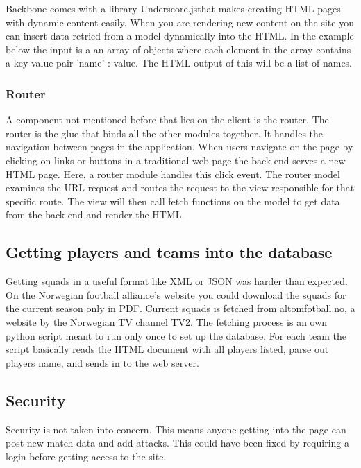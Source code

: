 Backbone comes with a library Underscore.js\footnotemark that makes creating HTML pages with dynamic content easily. When you are rendering new content on the site you can insert data retried from a model dynamically into the HTML. In the example below the input is a an array of objects where each element in the array contains a key value pair 'name' : value. The HTML output of this will be a list of names.




\subsubsection{Router}

A component not mentioned before that lies on the client is the router. The router is the glue that binds all the other modules together. It handles the navigation between pages in the application. When users navigate on the page by clicking on links or buttons in a traditional web page the back-end serves a new HTML page. Here, a router module handles this click event. The router model examines the URL request and routes the request to the view responsible for that specific route. The view will then call fetch functions on the model to get data from the back-end and render the HTML.

\subsection{Getting players and teams into the database}

Getting squads in a useful format like XML or JSON was harder than expected. On the Norwegian football alliance's website you could download the squads for the current season only in PDF. Current squads is fetched from altomfotball.no, a website by the Norwegian TV channel TV2. The fetching process is an own python script meant to run only once to set up the database. For each team the script basically reads the HTML document with all players listed, parse out players name, and sends in to the web server.


\subsection{Security}
Security is not taken into concern. This means anyone getting into the page can post new match data and add attacks. This could have been fixed by requiring a login before getting access to the site. 



